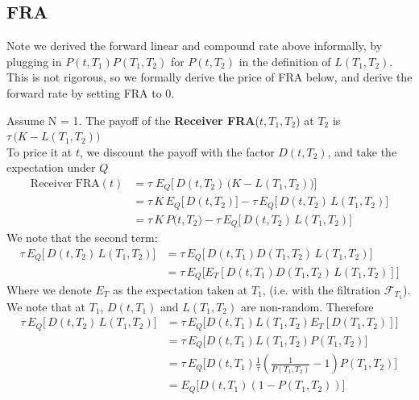     \subsection{FRA}
    Note we derived the forward linear and compound rate above informally,
    by plugging in $P(t, T_1) P(T_1, T_2)$ for $P(t, T_2)$ in the definition of $L(T_1, T_2)$.\\
    This is not rigorous, so we formally derive the price of FRA below,
    and derive the forward rate by setting FRA to 0.
    \begin{definition}
        Assume N = 1. The payoff of the \textbf{Receiver FRA}($t, T_1, T_2$) at \(T_2\)
        is $\tau \, \bigl(K - L(T_1, T_2)\bigr) $\\
        To price it at $t$, we discount the payoff with the factor \(D(t, T_2)\), 
        and take the expectation under \(Q\)
    \begin{align*}
        \mathrm{Receiver\;FRA}(t) 
          &= \tau\; E_Q\bigl[\,D(t, T_2)\,\bigl(K - L(T_1, T_2)\bigr)\bigr]\\
          &= \tau\,K\,E_Q\bigl[\,D(t, T_2)\bigr] - \tau\,E_Q\bigl[\,D(t, T_2)\,L(T_1, T_2)\bigr]\\
          &= \tau\,K\,P\bigl(t, T_2\bigr) - \tau\,E_Q\bigl[\,D(t, T_2)\,L(T_1, T_2)\bigr]
    \end{align*}
    We note that the second term:
    \begin{align*}
        \tau\, E_Q\bigl[\,D(t, T_2)\,L(T_1, T_2)\bigr]
        &= \tau\, E_Q\bigl[\,D(t, T_1) D(T_1, T_2)\,L(T_1, T_2)\bigr]\\
        &= \tau\, E_Q\bigl[ E_T[ D(t, T_1) D(T_1, T_2)\,L(T_1, T_2) ]\bigr]
    \end{align*}
    Where we denote $E_T$ as the expectation taken at $T_1$, 
    (i.e. with the filtration $\mathcal{F}_{T_1}$).\\
    We note that at $T_1$, $D(t, T_1)$ and $L(T_1, T_2)$ are non-random.
    Therefore
    \begin{align*}
        \tau\, E_Q\bigl[\,D(t, T_2)\,L(T_1, T_2)\bigr]
        &= \tau\, E_Q\bigl[ D(t, T_1) L(T_1, T_2) E_T[ D(T_1, T_2) ]\bigr]\\
        &= \tau\, E_Q\bigl[ D(t, T_1) L(T_1, T_2) P(T_1, T_2)\bigr]\\
        &= \tau\, E_Q\bigl[ D(t, T_1) \frac{1}{\tau} 
        \left( \frac{1}{P(T_1, T_2)} - 1 \right) P(T_1, T_2)\bigr]\\
        &= E_Q \bigl[ D(t, T_1) \left( 1 - P(T_1, T_2) \right) \bigr]\\

\end{align*}
\end{definition}
